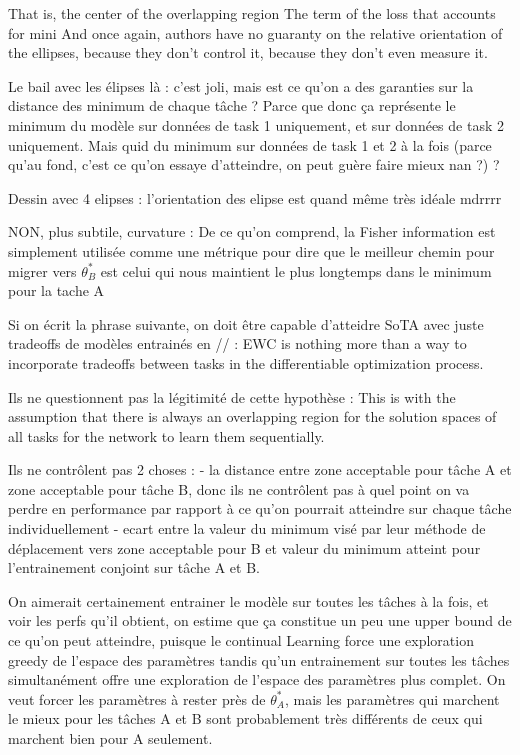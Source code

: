 \documentclass[11pt]{article}
\begin{document}
That is, the center of the overlapping region
The term of the loss that accounts for mini
And once again, authors have no guaranty on the relative orientation of the ellipses, because they don't control it, because they don't even measure it.


\vspace{1mm}
\noindent
Le bail avec les élipses là : c'est joli, mais est ce qu'on a des garanties sur la distance des minimum de chaque tâche ? 
Parce que donc ça représente le minimum du modèle sur données de task 1 uniquement, et sur données de task 2 uniquement. Mais quid du minimum sur données de task 1 et 2 à la fois (parce qu'au fond, c'est ce qu'on essaye d'atteindre, on peut guère faire mieux nan ?) ?

\vspace{1mm}
\noindent
Dessin avec 4 elipses : l'orientation des elipse est quand même très idéale mdrrrr

\vspace{1mm}
\noindent
NON, plus subtile, curvature :
De ce qu'on comprend, la Fisher information est simplement utilisée comme une métrique pour dire que le meilleur chemin pour migrer vers $\theta_B^*$ est celui qui nous maintient le plus longtemps dans le minimum pour la tache A

\vspace{1mm}
\noindent
Si on écrit la phrase suivante, on doit être capable d'atteidre SoTA avec juste tradeoffs de modèles entrainés en // : EWC is nothing more than a way to incorporate tradeoffs between tasks in the differentiable optimization process.

\vspace{1mm}
\noindent
Ils ne questionnent pas la légitimité de cette hypothèse :  This is with the assumption that there is always
an overlapping region for the solution spaces of all tasks for the network to learn them sequentially.

\vspace{1mm}
\noindent
Ils ne contrôlent pas 2 choses :
- la distance entre zone acceptable pour tâche A et zone acceptable pour tâche B, donc ils ne contrôlent pas à quel point on va perdre en performance par rapport à ce qu'on pourrait atteindre sur chaque tâche individuellement
- ecart entre la valeur du minimum visé par leur méthode de déplacement vers zone acceptable pour B et valeur du minimum atteint pour l'entrainement conjoint sur tâche A et B.

\vspace{1mm}
\noindent
On aimerait certainement entrainer le modèle sur toutes les tâches à la fois, et voir les perfs qu'il obtient, on estime que ça constitue un peu une upper bound de ce qu'on peut atteindre, puisque le continual Learning force une exploration greedy de l'espace des paramètres tandis qu'un entrainement sur toutes les tâches simultanément offre une exploration de l'espace des paramètres plus complet. On veut forcer les paramètres à rester près de $\theta_A^*$, mais les paramètres qui marchent le mieux pour les tâches A et B sont probablement très différents de ceux qui marchent bien pour A seulement.
\end{document}
